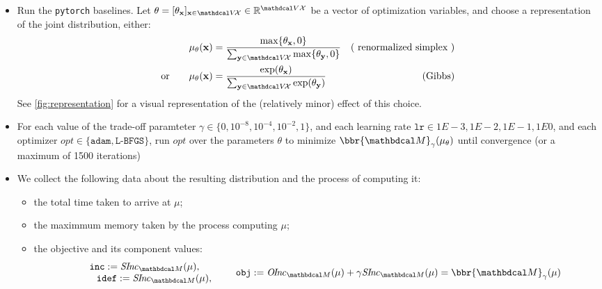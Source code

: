 \begin{subappendices}
\begin{itemize}
    \item Run the \texttt{pytorch} baselines.
    Let $\theta = [\theta_{\mat x}]_{\mat x \in \V\!\X} \in \mathbb R^{\V\X}$ be a vector of optimization variables, and choose a representation of the joint distribution, either:
    \begin{align*}
        \mu_{\theta}(\mat x) &= \frac{\max\{\theta_{\mat x}, 0\} }
            {\sum_{\mat y \in \V\!\X}\max\{\theta_{\mat y}, 0\} }
        &(\text{ renormalized simplex }) \\
    \text{or}\qquad
    \mu_{\theta}(\mat x) &= \frac{\exp(\theta_{\mat x})}{\sum_{\mat y \in \V\!\X} \exp(\theta_{\mat y})} & (\text{Gibbs})
    \end{align*}
    See \cref{fig:representation} for a visual representation of the (relatively minor) effect of this choice. 
    \item
    For each value of the trade-off paramteter 
    $\gamma \in \{0, 10^{-8}, 10^{-4}, 10^{-2}, 1\}$, and each learning rate $\texttt{lr} \in 1E-3, 1E-2, 1E-1, 1E0$, and each optimizer $\mathit{opt} \in \{\texttt{adam}, \texttt{L-BFGS}\}$,
    run $\mathit{opt}$ over the parameters $\theta$ to minimize $\bbr{\dg M}_\gamma(\mu_{\theta})$
     until convergence (or a maximum of 1500 iterations)

     \item We collect the following data about the resulting distribution and the process of computing it:
     \begin{itemize}[nosep]
         \item the total time taken to arrive at $\mu$;
         \item the maximmum memory taken by the process computing $\mu$;
         \item the objective and its component values:
         \vspace{-1ex}
         \[
            \begin{array}{c}
            \texttt{inc} := \SInc_{\dg M}(\mu), \\
            \qquad \texttt{idef} := \SInc_{\dg M}(\mu),
            \end{array}
            \qquad \texttt{obj} := \OInc_{\dg M}(\mu) + \gamma \SInc_{\dg M}(\mu) = \bbr{\dg M}_\gamma(\mu)
        \]
     \end{itemize}
\end{itemize}




\end{subappendices}
